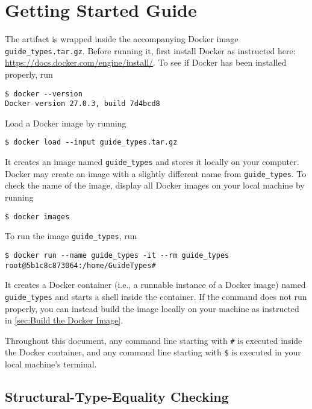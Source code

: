 
\section{Getting Started Guide}

The artifact is wrapped inside the accompanying Docker image
\texttt{guide\_types.tar.gz}.
%
Before running it, first install Docker as instructed here:
\url{https://docs.docker.com/engine/install/}.
%
To see if Docker has been installed properly, run
\begin{verbatim}
$ docker --version
Docker version 27.0.3, build 7d4bcd8
\end{verbatim}

Load a Docker image by running
\begin{verbatim}
$ docker load --input guide_types.tar.gz
\end{verbatim}
%
It creates an image named \texttt{guide\_types} and stores it locally on your
computer.
%
Docker may create an image with a slightly different name from
\texttt{guide\_types}.
%
To check the name of the image, display all Docker images on your local machine
by running
\begin{verbatim}
$ docker images
\end{verbatim}

To run the image \texttt{guide\_types}, run
\begin{verbatim}
$ docker run --name guide_types -it --rm guide_types
root@5b1c8c873064:/home/GuideTypes#
\end{verbatim}
%
It creates a Docker container (i.e., a runnable instance of a Docker image)
named \texttt{guide\_types} and starts a shell inside the container.
%
If the command does not run properly, you can instead build the image locally on
your machine as instructed in \cref{sec:Build the Docker Image}.

Throughout this document, any command line starting with \texttt{\#} is executed
inside the Docker container, and any command line starting with \texttt{\$} is
executed in your local machine's terminal.

\subsection{Structural-Type-Equality Checking}

